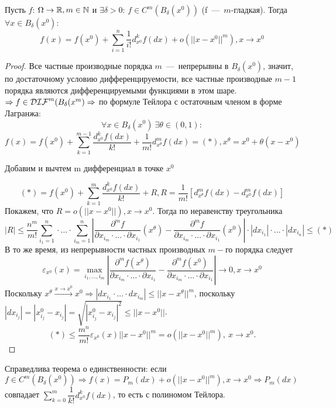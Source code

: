 \begin{theorem}
    Пусть $f$: $\Omega \rightarrow \mathbb{R}, m \in \mathbb{N}$ и $\exists \delta > 0$: $f \in C^m(B_\delta(x^0))$ (f~---~$m$-гладкая). Тогда $\forall x \in B_{\delta}(x^0)$: 
    \[f(x) = f(x^0) + \sum\limits_{i = 1}^n \frac{1}{i!}d^k_{x^0} f(dx) + o(||x - x^0||^m), x \rightarrow x^0\]
\end{theorem}
\begin{proof}
    Все частные производные порядка $m$~---~непрерывны в $B_{\delta}(x^0)$, значит, по достаточному условию дифференцируемости, все частные производные $m - 1$ порядка являются дифференцируемыми функциями в этом шаре. $\Rightarrow f \in \mathcal{DIF}^m(B_{\delta}(x^m) \Rightarrow$ по формуле Тейлора с остаточным членом в форме Лагранжа:
    \[\forall x \in B_{\delta}(x^0) \ \exists \theta \in (0, 1):\]
    \[f(x) = f(x^0) + \sum\limits_{k = 1}^{m - 1} \dfrac{d_{x^0}^k f(dx)}{k!} + \dfrac{1}{m!} d_{x^\theta}^m f(dx) = (*), x^\theta = x^0 + \theta(x - x^0)\]

Добавим и вычтем m дифференциал в точке $x^0$

    \[(*) = f(x^0) + \sum\limits_{k = 1}^m \dfrac{d_{x^0}^k f(dx)}{k!} + R, R = \dfrac{1}{m!}[d_{x^\theta}^m f(dx) - d_{x^0}^m f(dx)]\]
    Покажем, что $R = o(||x - x^0||), x \rightarrow x^0$. Тогда по неравенству треугольника
    \[|R| \leq \dfrac{n^m}{m!}\sum\limits_{i_1 = 1}^n \cdot \ldots \cdot \sum\limits_{i_m = 1}^n| \dfrac{\partial^m f}{\partial x_{i_m} \cdot \ldots \cdot \partial x_{i_1}}(x^\theta) - \dfrac{\partial^m f}{\partial x_{i_m} \cdot \ldots \cdot \partial x_{i_1}}(x^0)|
    \cdot |dx_{i_1}| \cdot \ldots \cdot |dx_{i_n}| \leq (*)\]
    В то же время, из непрерывности частных производных $m-$го порядка следует
    \[\varepsilon_{x^0}(x) = \max\limits_{i_1, \ldots, i_m} |\dfrac{\partial^m f(x^{\theta})}{\partial x_{i_m} \cdot \ldots \cdot \partial x_{i_1}} - \dfrac{\partial^m f(x^0)}{\partial x_{i_m} \cdot \ldots \cdot \partial x_{i_1}}| \rightarrow 0, x \rightarrow x^0\]
    Поскольку $x^\theta \xrightarrow{x \rightarrow x^0} x^0 \Rightarrow |dx_{i_1}\cdot \ldots \cdot dx_{i_m}| \leq ||x - x^\theta||^m$, поскольку $|dx_{i_j}| = |x_{i_j}^0 - x_{i_j}| = \sqrt{|x^0_{i_j} - x_{i_j}|^2} \leq ||x - x^0||$. 
    \[(*) \leq \dfrac{m^n}{m!} \varepsilon_{x^0} (x) ||x - x^0||^m = o(||x - x^0||^m), \ x \rightarrow x^{0}.\]
\end{proof}
\begin{note}
    Справедлива теорема о единственности: если $f \in C^m(B_\delta(x^0)) \Rightarrow f(x) = P_m(dx) + o(||x - x^0||^m), x \rightarrow x^0 \Rightarrow P_m(dx)$ совпадает $\sum\limits_{k = 0}^m \dfrac{1}{k!}  d_{x^0}^k f(dx)$, то есть с полиномом Тейлора.
\end{note}


